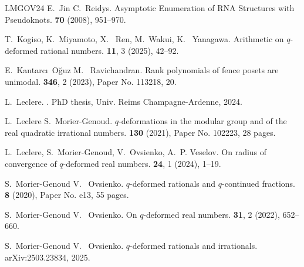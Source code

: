 \documentclass[11pt,reqno]{amsart}
\theoremstyle{plain}
\theoremstyle{definition}
\numberwithin{figure}{section}
\numberwithin{table}{section}
\numberwithin{equation}{section}
\begin{document}
\begin{thebibliography}{LMGOV24}
E.~\bgroup\sc Jin\egroup{} \andname{} C.~\bgroup\sc Reidys\egroup{}.
\newblock Asymptotic Enumeration of {RNA} Structures with Pseudoknots.
 {\bf 70} (2008), 951--970.

T.~\bgroup\sc Kogiso\egroup{}, K.~\bgroup\sc Miyamoto\egroup{}, X.~\bgroup\sc
  Ren\egroup{}, M.~\bgroup\sc Wakui\egroup{}, \andname{} K.~\bgroup\sc
  Yanagawa\egroup{}.
\newblock Arithmetic on $q$-deformed rational numbers.
 {\bf 11}, 3 (2025), 42--92.

E.~\bgroup\sc Kantarc\i~O{\u g}uz\egroup{} \andname{} M.~\bgroup\sc
  Ravichandran\egroup{}.
\newblock Rank polynomials of fence posets are unimodal.
 {\bf 346}, 2 (2023), Paper No. 113218, 20.

L.~\bgroup\sc Leclere\egroup{}.
.
\newblock PhD thesis, Univ. Reims Champagne-Ardenne, 2024.

L.~\bgroup\sc Leclere\egroup{} \andname{} S.~\bgroup\sc Morier-Genoud\egroup{}.
\newblock $q$-deformations in the modular group and of the real quadratic
  irrational numbers.
 {\bf 130} (2021), Paper No. 102223, 28
  pages.

L.~\bgroup\sc Leclere\egroup{}, S.~\bgroup\sc Morier-Genoud\egroup{},
  V.~\bgroup\sc Ovsienko\egroup{}, \andname{} A.~P. \bgroup\sc
  Veselov\egroup{}.
\newblock On radius of convergence of {$q$}-deformed real numbers.
 {\bf 24}, 1 (2024), 1--19.

S.~\bgroup\sc Morier-Genoud\egroup{} \andname{} V.~\bgroup\sc
  Ovsienko\egroup{}.
\newblock $q$-deformed rationals and $q$-continued fractions.
 {\bf 8} (2020), Paper No. e13, 55 pages.

S.~\bgroup\sc Morier-Genoud\egroup{} \andname{} V.~\bgroup\sc
  Ovsienko\egroup{}.
\newblock On $q$-deformed real numbers.
 {\bf 31}, 2 (2022), 652--660.

S.~\bgroup\sc Morier-Genoud\egroup{} \andname{} V.~\bgroup\sc
  Ovsienko\egroup{}.
\newblock $q$-deformed rationals and irrationals.
\newblock arXiv{\string:}2503.23834, 2025.


\end{thebibliography}
\end{document}
